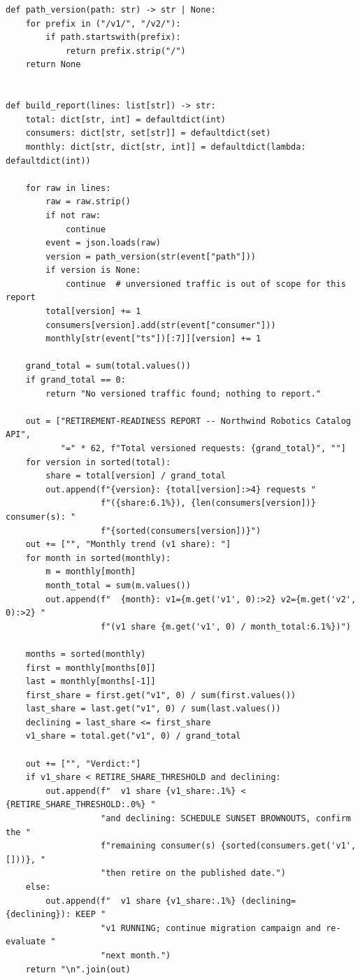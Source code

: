 \begin{verbatim}
def path_version(path: str) -> str | None:
    for prefix in ("/v1/", "/v2/"):
        if path.startswith(prefix):
            return prefix.strip("/")
    return None


def build_report(lines: list[str]) -> str:
    total: dict[str, int] = defaultdict(int)
    consumers: dict[str, set[str]] = defaultdict(set)
    monthly: dict[str, dict[str, int]] = defaultdict(lambda: defaultdict(int))

    for raw in lines:
        raw = raw.strip()
        if not raw:
            continue
        event = json.loads(raw)
        version = path_version(str(event["path"]))
        if version is None:
            continue  # unversioned traffic is out of scope for this report
        total[version] += 1
        consumers[version].add(str(event["consumer"]))
        monthly[str(event["ts"])[:7]][version] += 1

    grand_total = sum(total.values())
    if grand_total == 0:
        return "No versioned traffic found; nothing to report."

    out = ["RETIREMENT-READINESS REPORT -- Northwind Robotics Catalog API",
           "=" * 62, f"Total versioned requests: {grand_total}", ""]
    for version in sorted(total):
        share = total[version] / grand_total
        out.append(f"{version}: {total[version]:>4} requests "
                   f"({share:6.1%}), {len(consumers[version])} consumer(s): "
                   f"{sorted(consumers[version])}")
    out += ["", "Monthly trend (v1 share): "]
    for month in sorted(monthly):
        m = monthly[month]
        month_total = sum(m.values())
        out.append(f"  {month}: v1={m.get('v1', 0):>2} v2={m.get('v2', 0):>2} "
                   f"(v1 share {m.get('v1', 0) / month_total:6.1%})")

    months = sorted(monthly)
    first = monthly[months[0]]
    last = monthly[months[-1]]
    first_share = first.get("v1", 0) / sum(first.values())
    last_share = last.get("v1", 0) / sum(last.values())
    declining = last_share <= first_share
    v1_share = total.get("v1", 0) / grand_total

    out += ["", "Verdict:"]
    if v1_share < RETIRE_SHARE_THRESHOLD and declining:
        out.append(f"  v1 share {v1_share:.1%} < {RETIRE_SHARE_THRESHOLD:.0%} "
                   "and declining: SCHEDULE SUNSET BROWNOUTS, confirm the "
                   f"remaining consumer(s) {sorted(consumers.get('v1', []))}, "
                   "then retire on the published date.")
    else:
        out.append(f"  v1 share {v1_share:.1%} (declining={declining}): KEEP "
                   "v1 RUNNING; continue migration campaign and re-evaluate "
                   "next month.")
    return "\n".join(out)



\end{verbatim}
